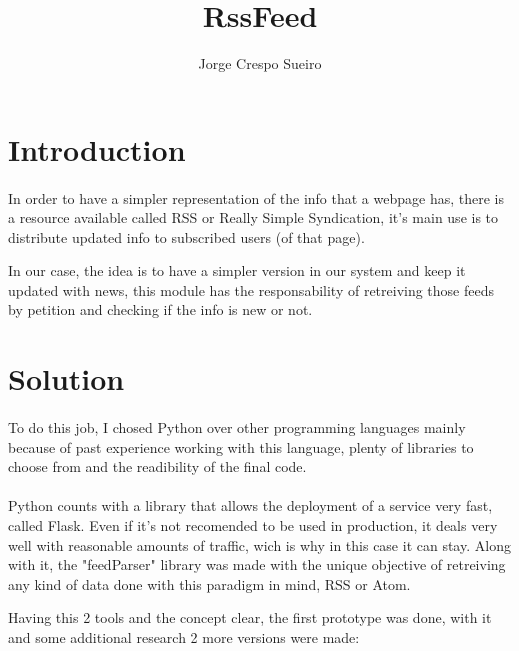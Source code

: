 \documentclass{article}
\title{RssFeed}
\begin{document}
\author{Jorge Crespo Sueiro}
\maketitle
\tableofcontents
\newpage

\section{Introduction}
\paragraph{}
\paragraph{}
In order to have a simpler representation of the info that a webpage has, there is a resource available called RSS or Really Simple Syndication, it's main use is to distribute updated info to subscribed users (of that page).

In our case, the idea is to have a simpler version in our system and keep it updated with news, this module has the responsability of retreiving those feeds by petition and checking if the info is new or not.

\section{Solution}
\paragraph{} 
To do this job, I chosed Python over other programming languages mainly because of past experience working with this language, plenty of libraries to choose from and the readibility of the final code.
\paragraph{}
Python counts with a library that allows the deployment of a service very fast, called Flask. Even if it's not recomended to be used in production, it deals very well with reasonable amounts of traffic, wich is why in this case it can stay.
Along with it, the "feedParser" library was made with the unique objective of retreiving any kind of data done with this paradigm in mind, RSS or Atom.

Having this 2 tools and the concept clear, the first prototype was done, with it and some additional research 2 more versions were made:
\end{document}
